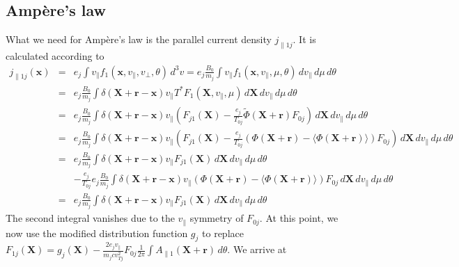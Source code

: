 \subsection{Amp\`ere's law}
\label{sec:field2}
What we need for Amp\`ere's law is the parallel current density
$j_{\|1j}$. It is calculated according to
\begin{eqnarray*}
  j_{\|1j}(\mathbf{x}) &=& e_j\int v_\|f_1(\mathbf{x},v_\|,v_\bot,\theta)\,d^3v
  =e_j\frac{B_0}{m_j}\int v_\| f_1(\mathbf{x},v_\|,\mu,\theta)\,dv_\|\,d\mu\,d\theta\\
  &=&e_j\frac{B_0}{m_j}\int \delta(\mathbf{X}+\mathbf{r}-\mathbf{x}) v_\|
  T^*F_1(\mathbf{X},v_\|,\mu)\,d\mathbf{X}\,dv_\|\,d\mu\,d\theta\\
  &=&e_j\frac{B_0}{m_j}\int \delta(\mathbf{X}+\mathbf{r}-\mathbf{x}) v_\|
  \left(
    F_{j1}(\mathbf{X})
    -\frac{e_j}{T_{0j}}\tilde\Phi(\mathbf{X}+\mathbf{r}) F_{0j}
  \right)\,d\mathbf{X}\,dv_\|\,d\mu\,d\theta\\
  &=&e_j\frac{B_0}{m_j}\int \delta(\mathbf{X}+\mathbf{r}-\mathbf{x}) v_\|
  \left(
    F_{j1}(\mathbf{X})
    -\frac{e_j}{T_{0j}}\left(\Phi(\mathbf{X}+\mathbf{r})-\langle\Phi(\mathbf{X}+\mathbf{r})\rangle\right) F_{0j}
  \right)\,d\mathbf{X}\,dv_\|\,d\mu\,d\theta\\
  &=& e_j\frac{B_0}{m_j}\int \delta(\mathbf{X}+\mathbf{r}-\mathbf{x}) v_\|F_{j1}(\mathbf{X})\,d\mathbf{X}\,dv_\|\,d\mu\,d\theta\\
  &&-\frac{e_j}{T_{0j}}e_j\frac{B_0}{m_j}
  \int \delta(\mathbf{X}+\mathbf{r}-\mathbf{x}) v_\|\left(
    \Phi(\mathbf{X}+\mathbf{r})
    -\langle\Phi(\mathbf{X}+\mathbf{r})\rangle
  \right) F_{0j}\,d\mathbf{X}\,dv_\|\,d\mu\,d\theta\\
  &=& e_j\frac{B_0}{m_j}\int \delta(\mathbf{X}+\mathbf{r}-\mathbf{x}) v_\|F_{j1}(\mathbf{X})\,d\mathbf{X}\,dv_\|\,d\mu\,d\theta
\end{eqnarray*}
The second integral vanishes due to the $v_\|$ symmetry of
$F_{0j}$. At this point, we now use the modified distribution function
$g_j$ to replace
$F_{1j}(\mathbf{X})=g_j(\mathbf{X})-\frac{2e_jv_\|}{m_jcv_{Tj}^2}
F_{0j}\frac{1}{2\pi}\int A_{\|1}(\mathbf{X}+\mathbf{r})\,d\theta$. We
arrive at
